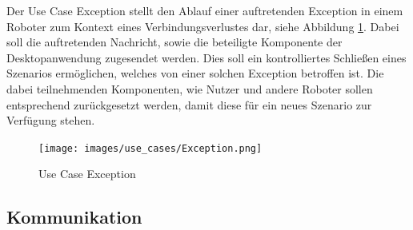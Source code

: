Der Use Case Exception stellt den Ablauf einer auftretenden Exception in einem Roboter zum Kontext eines Verbindungsverlustes dar, siehe Abbildung \ref{fig:Exception}. Dabei soll die auftretenden Nachricht, sowie die beteiligte Komponente der Desktopanwendung zugesendet werden. Dies soll ein kontrolliertes Schließen eines Szenarios ermöglichen, welches von einer solchen Exception betroffen ist. Die dabei teilnehmenden Komponenten, wie Nutzer und andere Roboter sollen entsprechend zurückgesetzt werden, damit diese für ein neues Szenario zur Verfügung stehen.\\

\begin{figure}[h]
	\begin{center}
		\texttt{[image: images/use\_cases/Exception.png]}
	\end{center}
	\caption{Use Case Exception}
	\label{fig:Exception}
\end{figure}

\newpage
\subsection{Kommunikation}